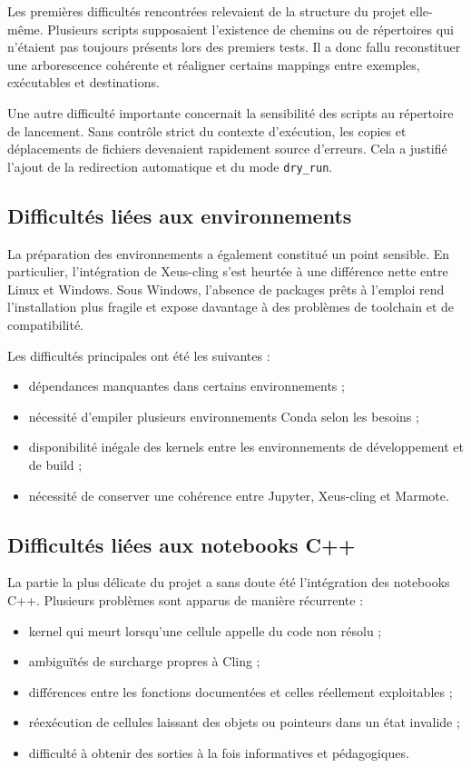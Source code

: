 \documentclass[a4paper,12pt,twoside]{article}
\begin{document}
Les premières difficultés rencontrées relevaient de la structure du projet elle-même. Plusieurs scripts supposaient l'existence de chemins ou de répertoires qui n'étaient pas toujours présents lors des premiers tests. Il a donc fallu reconstituer une arborescence cohérente et réaligner certains mappings entre exemples, exécutables et destinations.

Une autre difficulté importante concernait la sensibilité des scripts au répertoire de lancement. Sans contrôle strict du contexte d'exécution, les copies et déplacements de fichiers devenaient rapidement source d'erreurs. Cela a justifié l'ajout de la redirection automatique et du mode \texttt{dry\_run}.

\subsection{Difficultés liées aux environnements}

La préparation des environnements a également constitué un point sensible. En particulier, l'intégration de Xeus-cling s'est heurtée à une différence nette entre Linux et Windows. Sous Windows, l'absence de packages prêts à l'emploi rend l'installation plus fragile et expose davantage à des problèmes de toolchain et de compatibilité.

Les difficultés principales ont été les suivantes :
\begin{itemize}
    \item dépendances manquantes dans certains environnements ;
    \item nécessité d'empiler plusieurs environnements Conda selon les besoins ;
    \item disponibilité inégale des kernels entre les environnements de développement et de build ;
    \item nécessité de conserver une cohérence entre Jupyter, Xeus-cling et Marmote.
\end{itemize}

\subsection{Difficultés liées aux notebooks C++}

La partie la plus délicate du projet a sans doute été l'intégration des notebooks C++. Plusieurs problèmes sont apparus de manière récurrente :
\begin{itemize}
    \item kernel qui meurt lorsqu'une cellule appelle du code non résolu ;
    \item ambiguïtés de surcharge propres à Cling ;
    \item différences entre les fonctions documentées et celles réellement exploitables ;
    \item réexécution de cellules laissant des objets ou pointeurs dans un état invalide ;
    \item difficulté à obtenir des sorties à la fois informatives et pédagogiques.
\end{itemize}
\end{document}
